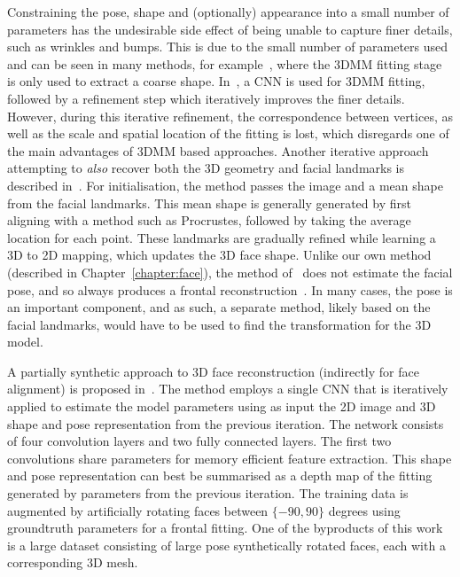 Constraining the pose, shape and (optionally) appearance into a small
number of parameters has the undesirable side effect of being unable
to capture finer details, such as wrinkles and bumps. This is due to
the small number of parameters used and can be seen in many methods,
for example~\cite{richardson2016learning}, where the 3DMM fitting
stage is only used to extract a coarse
shape. In~\cite{sela2017unrestricted}, a CNN is used for 3DMM fitting,
followed by a refinement step which iteratively improves the finer
details. However, during this iterative refinement, the correspondence
between vertices, as well as the scale and spatial location of the
fitting is lost, which disregards one of the main advantages of 3DMM
based approaches. Another iterative approach attempting to
\textit{also} recover both the 3D geometry and facial landmarks is
described in~\cite{liu2016joint}. For initialisation, the method
passes the image and a mean shape from the facial landmarks. This mean
shape is generally generated by first aligning with a method such as
Procrustes, followed by taking the average location for each
point. These landmarks are gradually refined while learning a 3D to 2D
mapping, which updates the 3D face shape. Unlike our own method
(described in Chapter~\ref{chapter:face}), the method
of~\citeauthor{liu2016joint} does not estimate the facial pose, and so
always produces a frontal reconstruction~\cite{liu2016joint}. In many
cases, the pose is an important component, and as such, a separate
method, likely based on the facial landmarks, would have to be used to
find the transformation for the 3D model.

A partially synthetic approach to 3D face reconstruction (indirectly
for face alignment) is proposed in~\cite{zhu2016face}. The method
employs a single CNN that is iteratively applied to estimate the model
parameters using as input the 2D image and 3D shape and pose
representation from the previous iteration. The network consists of
four convolution layers and two fully connected layers. The first two
convolutions share parameters for memory efficient feature
extraction. This shape and pose representation can best be summarised
as a depth map of the fitting generated by parameters from the
previous iteration. The training data is augmented by artificially
rotating faces between $\{-90, 90\}$ degrees using groundtruth
parameters for a frontal fitting. One of the byproducts of this work
is a large dataset consisting of large pose synthetically rotated
faces, each with a corresponding 3D mesh.


